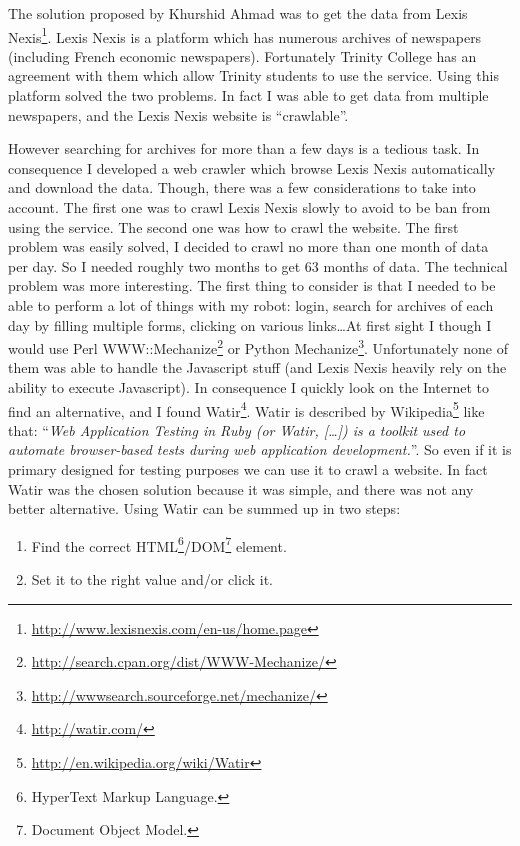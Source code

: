 \documentclass[12pt]{report}
\begin{document}
			The solution proposed by Khurshid Ahmad was to get the data from Lexis Nexis\footnote{\url{http://www.lexisnexis.com/en-us/home.page}}. Lexis Nexis is a platform which has numerous archives of newspapers (including French economic newspapers). Fortunately Trinity College has an agreement with them which allow Trinity students to use the service. Using this platform solved the two problems. In fact I was able to get data from multiple newspapers, and the Lexis Nexis website is ``crawlable''.

			However searching for archives for more than a few days is a tedious task. In consequence I developed a web crawler which browse Lexis Nexis automatically and download the data. Though, there was a few considerations to take into account. The first one was to crawl Lexis Nexis slowly to avoid to be ban from using the service. The second one was how to crawl the website. The first problem was easily solved, I decided to crawl no more than one month of data per day. So I needed roughly two months to get 63 months of data. The technical problem was more interesting. The first thing to consider is that I needed to be able to perform a lot of things with my robot: login, search for archives of each day by filling multiple forms, clicking on various links\ldots At first sight I though I would use Perl WWW::Mechanize\footnote{\url{http://search.cpan.org/dist/WWW-Mechanize/}} or Python Mechanize\footnote{\url{http://wwwsearch.sourceforge.net/mechanize/}}. Unfortunately none of them was able to handle the Javascript stuff (and Lexis Nexis heavily rely on the ability to execute Javascript). In consequence I quickly look on the Internet to find an alternative, and I found Watir\footnote{\url{http://watir.com/}}. Watir is described by Wikipedia\footnote{\url{http://en.wikipedia.org/wiki/Watir}} like that: ``\emph{Web Application Testing in Ruby (or Watir, [\ldots]) is a toolkit used to automate browser-based tests during web application development.}''. So even if it is primary designed for testing purposes we can use it to crawl a website. In fact Watir was the chosen solution because it was simple, and there was not any better alternative. Using Watir can be summed up in two steps:
			\begin{enumerate}
				\item Find the correct HTML\footnote{HyperText Markup Language.}/DOM\footnote{Document Object Model.} element.
				\item Set it to the right value and/or click it.
			\end{enumerate}
\end{document}
